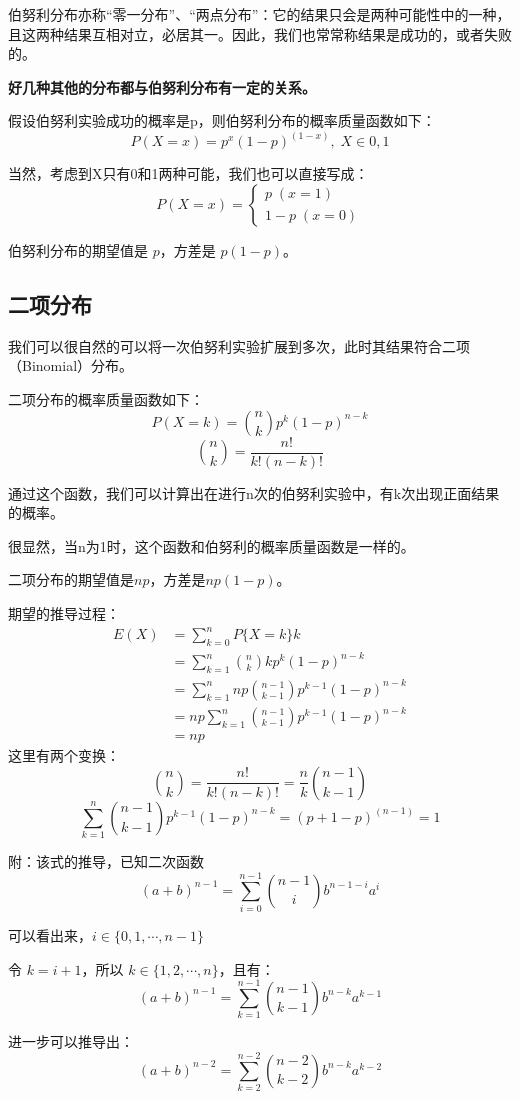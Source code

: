 \documentclass[12pt]{article}
\begin{document}
伯努利分布亦称“零一分布”、“两点分布”：它的结果只会是两种可能性中的一种，且这两种结果互相对立，必居其一。因此，我们也常常称结果是成功的，或者失败的。

\textbf{好几种其他的分布都与伯努利分布有一定的关系。}

假设伯努利实验成功的概率是p，则伯努利分布的概率质量函数如下：
$$
P(X=x) = p^x (1 - p)^{(1-x)},\; X \in {0, 1}
$$

当然，考虑到X只有0和1两种可能，我们也可以直接写成：
$$
P(X=x) =
\begin{cases}
p\;(x=1) \\
1-p\;(x=0)
\end{cases}
$$

伯努利分布的期望值是 $p$，方差是 $p(1−p)$。

\subsection{二项分布}
我们可以很自然的可以将一次伯努利实验扩展到多次，此时其结果符合二项（Binomial）分布。

二项分布的概率质量函数如下：
$$
P(X=k) = \binom{n}{k}p^{k}(1-p)^{n-k}
$$
$$
\binom{n}{k}  = \frac{n!}{k!(n-k)!}
$$

通过这个函数，我们可以计算出在进行n次的伯努利实验中，有k次出现正面结果的概率。

很显然，当n为1时，这个函数和伯努利的概率质量函数是一样的。

二项分布的期望值是$np$，方差是$np(1-p)$。

期望的推导过程：
\begin{align}
    E(X) &= \sum_{k=0}^nP\{X=k\}k \\
    &= \sum_{k=1}^n \binom{n}{k}kp^{k}(1-p)^{n-k} \\
    &= \sum_{k=1}^nnp\binom{n-1}{k-1}p^{k-1}(1-p)^{n-k} \\
    &= np\sum_{k=1}^n\binom{n-1}{k-1}p^{k-1}(1-p)^{n-k} \\
    &= np
\end{align}
这里有两个变换：
$$
\binom{n}{k} = \frac{n!}{k!(n-k)!} = \frac{n}{k}\binom{n-1}{k-1}
$$
$$
\sum_{k=1}^n\binom{n-1}{k-1}p^{k-1}(1-p)^{n-k} = (p+1-p)^{(n-1)} = 1
$$
\begin{framed}  
附：该式的推导，已知二次函数
$$
(a+b)^{n-1} = \sum_{i=0}^{n-1}\binom{n-1}{i}b^{n-1-i}a^i
$$

可以看出来，$i \in \{0, 1, \cdots, n-1\}$

令 $k=i+1$，所以 $k \in \{1, 2, \cdots, n\}$，且有：
$$
(a+b)^{n-1} = \sum_{k=1}^{n-1}\binom{n-1}{k-1}b^{n-k}a^{k-1}
$$

进一步可以推导出：
$$
(a+b)^{n-2} = \sum_{k=2}^{n-2} \binom{n-2}{k-2}b^{n-k}a^{k-2}
$$
\end{framed}  
\end{document}
